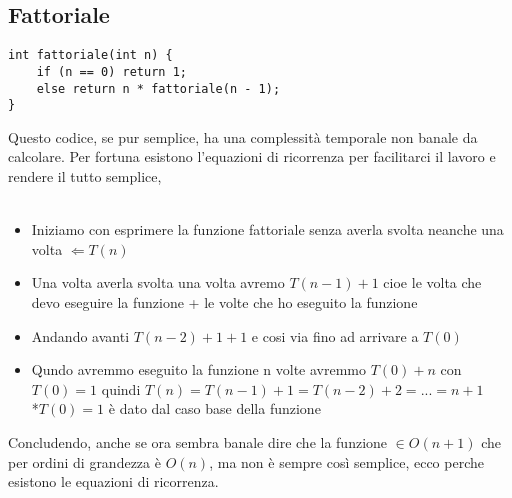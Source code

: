 \documentclass[a4paper,12pt]{article}
\begin{document}
\subsection{Fattoriale}
\begin{lstlisting}[style=mystyle]
int fattoriale(int n) {
    if (n == 0) return 1;
    else return n * fattoriale(n - 1);
}
\end{lstlisting}

Questo codice, se pur semplice, ha una complessità temporale non banale da calcolare. Per fortuna esistono l'equazioni di ricorrenza per facilitarci il lavoro e rendere il tutto semplice, \\
\\
\begin{itemize}
    \item Iniziamo con esprimere la funzione fattoriale senza averla svolta neanche una volta $\Leftarrow T(n) $
    \item Una volta averla svolta una volta avremo $T(n-1) + 1$ cioe le volta che devo eseguire la funzione + le volte che ho eseguito la funzione
    \item Andando avanti $T(n-2) + 1 + 1$ e cosi via fino ad arrivare a $T(0)$
    \item  Qundo avremmo eseguito la funzione n volte avremmo $T(0) + n$ con $T(0) = 1$ quindi $T(n) = T(n-1) + 1 = T(n-2) + 2 = ... = n + 1$  \\{\tiny{*$T(0) = 1 $ è dato dal caso base della funzione}}
\end{itemize}
Concludendo, anche se ora sembra banale dire che la funzione $\in O(n +1)$ che per ordini di grandezza è $O(n)$, ma non è sempre così semplice, ecco perche esistono le equazioni di ricorrenza. \\
\end{document}
